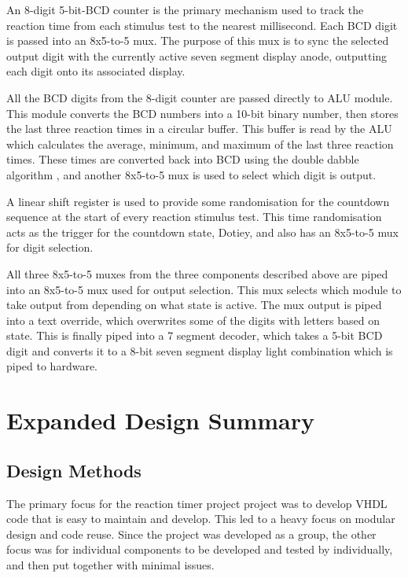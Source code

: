 \documentclass[11pt]{article}
\begin{document}
An 8-digit 5-bit-BCD counter is the primary mechanism used to track the reaction time from each stimulus test to the nearest millisecond. Each BCD digit is passed into an 8x5-to-5 mux. The purpose of this mux is to sync the selected output digit with the currently active seven segment display anode, outputting each digit onto its associated display.

All the BCD digits from the 8-digit counter are passed directly to ALU module. This module converts the BCD numbers into a 10-bit binary number, then stores the last three reaction times in a circular buffer. This buffer is read by the ALU which calculates the average, minimum, and maximum of the last three reaction times. These times are converted back into BCD using the double dabble algorithm \cite{double_dabble}, and another 8x5-to-5 mux is used to select which digit is output.

A linear shift register is used to provide some randomisation for the countdown sequence at the start of every reaction stimulus test. This time randomisation acts as the trigger for the countdown state, Dotiey, and also has an 8x5-to-5 mux for digit selection.

All three 8x5-to-5 muxes from the three components described above are piped into an 8x5-to-5 mux used for output selection. This mux selects which module to take output from depending on what state is active. The mux output is piped into a text override, which overwrites some of the digits with letters based on state. This is finally piped into a 7 segment decoder, which takes a 5-bit BCD digit and converts it to a 8-bit seven segment display light combination which is piped to hardware.

\section{Expanded Design Summary}

\subsection{Design Methods}

The primary focus for the reaction timer project project was to develop VHDL code that is easy to maintain and develop. This led to a heavy focus on modular design and code reuse. Since the project was developed as a group, the other focus was for individual components to be developed and tested by individually, and then put together with minimal issues. 
\end{document}
